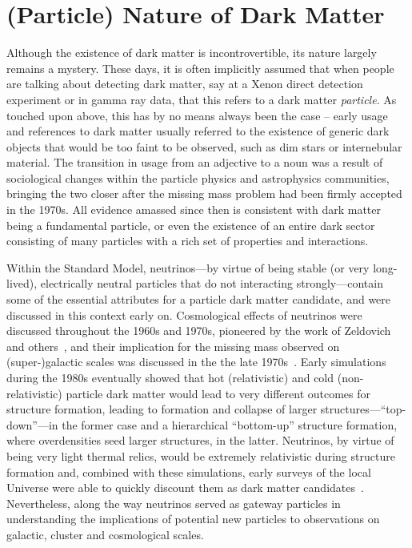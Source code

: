\section{(Particle) Nature of Dark Matter}
\label{sec:particledm}

Although the existence of dark matter is incontrovertible, its nature largely remains a mystery. These days, it is often implicitly assumed that when people are talking about detecting dark matter, say at a Xenon direct detection experiment or in gamma ray data, that this refers to a dark matter \emph{particle}. As touched upon above, this has by no means always been the case -- early usage and references to dark matter usually referred to the existence of generic dark objects that would be too faint to be observed, such as dim stars or internebular material. The transition in usage from an adjective to a noun was a result of sociological changes within the particle physics and astrophysics communities, bringing the two closer after the missing mass problem had been firmly accepted in the 1970s. All evidence amassed since then is consistent with dark matter being a fundamental particle, or even the existence of an entire dark sector consisting of many particles with a rich set of properties and interactions.

Within the Standard Model, neutrinos---by virtue of being stable (or very long-lived), electrically neutral particles that do not interacting strongly---contain some of the essential attributes for a particle dark matter candidate, and were discussed in this context early on. Cosmological effects of neutrinos were discussed throughout the 1960s and 1970s, pioneered by the work of Zeldovich and others~\cite{Gershtein:1966gg,PhysRevLett.29.669}, and their implication for the missing mass observed on (super-)galactic scales was discussed in the the late 1970s~\cite{PhysRevLett.39.165,1978ApJ...223.1015G}. Early simulations during the 1980s eventually showed that hot (relativistic) and cold (non-relativistic) particle dark matter would lead to very different outcomes for structure formation, leading to formation and collapse of larger structures---``top-down''---in the former case and a hierarchical ``bottom-up'' structure formation, where overdensities seed larger structures, in the latter. Neutrinos, by virtue of being very light thermal relics, would be extremely relativistic during structure formation and, combined with these simulations, early surveys of the local Universe were able to quickly discount them as dark matter candidates~\cite{1983ApJ...274L...1W}. Nevertheless, along the way neutrinos served as gateway particles in understanding the implications of potential new particles to observations on galactic, cluster and cosmological scales.

